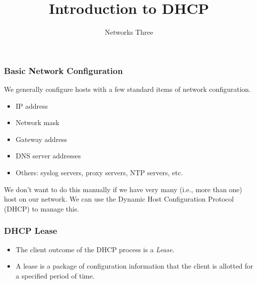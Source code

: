 \documentclass[10pt]{beamer}
\title{Introduction to DHCP}
\author[IN715]{Networks Three}
\institute[Otago Polytechnic]{
  Otago Polytechnic \\
  Dunedin, New Zealand \\
}
\date{}
\begin{document}
\begin{frame}[plain]
  \titlepage
\end{frame}


\begin{frame}
  \frametitle{Basic Network Configuration}

  We generally configure hosts with a few standard items of network configuration.
  \begin{itemize}
    \item IP address
    \item Network mask
    \item Gateway address
    \item DNS server addresses
    \item Others:  syslog servers, proxy servers, NTP servers, etc.
  \end{itemize} 

  We don't want to do this manually if we have very many (i.e., more than one) host on our network.  We can use the Dynamic Host Configuration Protocol (DHCP) to manage this. 
\end{frame}



\begin{frame}
  \frametitle{DHCP Lease}
  \begin{itemize}
    \item The client outcome of the DHCP process is a \emph{Lease}.
    \item A lease is a package of configuration information that the client
          is allotted for a specified period of time.
  \end{itemize}  
\end{frame}
\end{document}
